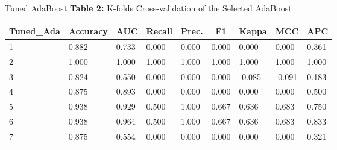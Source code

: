 \documentclass[
  10pt,
  ignorenonframetext,
  fontset=fandol]{beamer}
\begin{document}
\begin{frame}{Tuned AdaBoost}
\protect\hypertarget{tuned-adaboost}{}
\textbf{Table 2:} K-folds Cross-validation of the Selected AdaBoost
\centering \tiny

\begin{table}[]
\begin{tabular}{lllllllll}
\hline
\multicolumn{1}{c}{Tuned\_Ada} & \multicolumn{1}{c}{Accuracy} & \multicolumn{1}{c}{AUC} & \multicolumn{1}{c}{Recall} & \multicolumn{1}{c}{Prec.} & \multicolumn{1}{c}{F1} & \multicolumn{1}{c}{Kappa} & \multicolumn{1}{c}{MCC} & \multicolumn{1}{c}{APC} \\ \hline
1                              & 0.882                        & 0.733                   & 0.000                      & 0.000                     & 0.000                  & 0.000                     & 0.000                   & 0.361                   \\ 
2                              & 1.000                        & 1.000                   & 1.000                      & 1.000                     & 1.000                  & 1.000                     & 1.000                   & 1.000                   \\
3                              & 0.824                        & 0.550                   & 0.000                      & 0.000                     & 0.000                  & -0.085                    & -0.091                  & 0.183                   \\
4                              & 0.875                        & 0.893                   & 0.000                      & 0.000                     & 0.000                  & 0.000                     & 0.000                   & 0.500                   \\
5                              & 0.938                        & 0.929                   & 0.500                      & 1.000                     & 0.667                  & 0.636                     & 0.683                   & 0.750                   \\
6                              & 0.938                        & 0.964                   & 0.500                      & 1.000                     & 0.667                  & 0.636                     & 0.683                   & 0.833                   \\
7                              & 0.875                        & 0.554                   & 0.000                      & 0.000                     & 0.000                  & 0.000                     & 0.000                   & 0.321                   \\

\end{tabular}
\end{table}
\end{frame}
\end{document}
